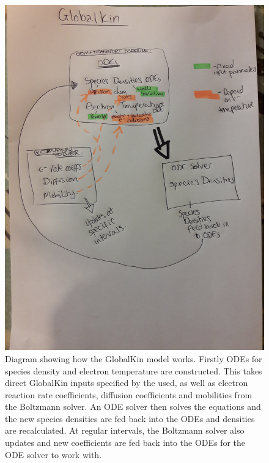 \documentclass[11pt, oneside]{article}   	%
\begin{document}
\begin{figure}
\includegraphics[width=\textwidth]{Figures/GlobalKinDiagram}
\caption{Diagram showing how the GlobalKin model works. Firstly ODEs for species density and electron temperature are constructed. This takes direct GlobalKin inputs specified by the used, as well as electron reaction rate coefficients, diffusion coefficients and mobilities from the Boltzmann solver. An ODE solver then solves the equations and the new species densities are fed back into the ODEs and densities are recalculated. At regular intervals, the Boltzmann solver also updates and new coefficients are fed back into the ODEs for the ODE solver to work with.}
\label{GlobalKinDiagram}
\end{figure}


\end{document}
